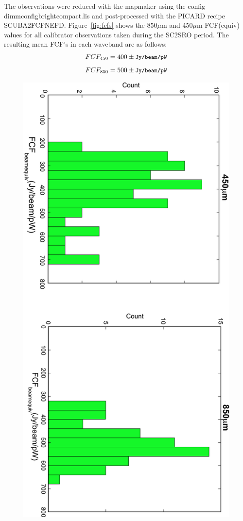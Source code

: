 \documentclass[twoside,11pt]{article}
\renewcommand{\_}{\texttt{\symbol{95}}}
\newcommand{\text}[1]{{\small \texttt{#1}}}
\begin{document}
The observations were reduced with the mapmaker using the config
dimmconfig\_bright\_compact.lis and post-processed with the PICARD
recipe SCUBA2\_FCFNEFD. Figure~\ref{fig:fcfs} shows the 850$\mu$m and
450$\mu$m FCF(equiv) values for all calibrator observations taken
during the SC2SRO period. The resulting mean FCF's in each waveband
are as follows:
\begin{equation}
FCF_{450} = 400 \pm \text{Jy/beam/pW}
\end{equation}
\begin{equation}
FCF_{850} = 500 \pm \text{Jy/beam/pW}
\end{equation}

\begin{figure}
\begin{center}
\includegraphics[width=\linewidth]{sc19_fcf_hist}

\end{center}
\end{figure}
\end{document}
